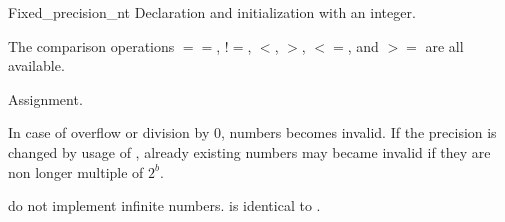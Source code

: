 \begin{ccClass}{Fixed_precision_nt}
            {Declaration and initialization with an integer.}

\ccOperations

The comparison operations $==$, $!=$, $<$, $>$, $<=$, and $>=$ are all
available.

        {Assignment. 
}

{In case of overflow or division by 0, numbers becomes invalid.
If the precision is changed by usage of 
, already existing numbers may became invalid
if they are non longer multiple of $2^b$.}

{ \ccClassName do not implement infinite numbers. 
   is identical to .}











\end{ccClass}
